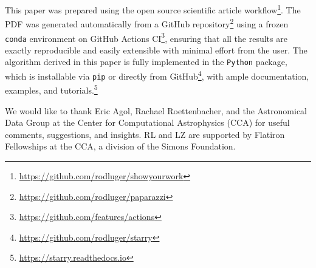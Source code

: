 \documentclass[modern]{aastex631}
\begin{document}
\vspace{1em}

This paper was prepared using the \showyourwork open source scientific article workflow\footnote{\url{https://github.com/rodluger/showyourwork}}.
The PDF was generated automatically from a GitHub repository\footnote{\url{https://github.com/rodluger/paparazzi}} using a frozen \texttt{conda} environment on GitHub Actions CI\footnote{\url{https://github.com/features/actions}}, ensuring that all the results are exactly reproducible and easily extensible with minimal effort from the user.
The algorithm derived in this paper is fully implemented in the \starry \texttt{Python} package, which is installable via \texttt{pip} or directly from GitHub\footnote{\url{https://github.com/rodluger/starry}}, with ample documentation, examples, and tutorials.\footnote{\url{https://starry.readthedocs.io}}

\vspace{1em}

We would like to thank Eric Agol, Rachael Roettenbacher, and the Astronomical Data Group at the Center for Computational Astrophysics (CCA) for useful comments, suggestions, and insights.
RL and LZ are supported by Flatiron Fellowships at the CCA, a division of the Simons Foundation.

%
%
%
%
\clearpage
\appendix
%
%
%
%
\end{document}
